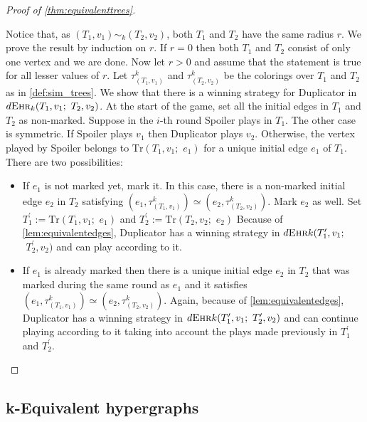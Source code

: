 \documentclass[12pt,notitlepage,a4paper]{article}
\theoremstyle{definition}
\newcommand{\morph}[1]{\sim_#1}
\newcommand{\ehr}{\textsc{Ehr}}
\begin{document}
\begin{proof}[Proof of \cref{thm:equivalenttrees}]~ \par
	Notice that, as $(T_1,v_1)\morph{k} (T_2,v_2)$, both $T_1$ and
	$T_2$ have the same radius $r$.
	We prove the result by induction on $r$.
	If $r=0$ then both $T_1$ and $T_2$ consist
	of only one vertex and we are done.
	Now let $r>0$ and assume that the 
	statement is true for all lesser values of $r$.
	Let $\tau^k_{(T_1,v_1)}$ and $\tau^k_{(T_2,v_2)}$ 
	be the colorings over $T_1$ and $T_2$ as in 
	\cref{def:sim_trees}. 
	We show that there is a winning strategy 
	for Duplicator in
	$d\ehr_k(T_1,v_1;\,\, T_2,v_2)$.
	At the start of the game, set all the initial edges
	in $T_1$ and $T_2$ as non-marked. 
	Suppose in the $i$-th round Spoiler plays in 
	$T_1$. The other case is symmetric. 
	If Spoiler plays $v_1$ then Duplicator plays $v_2$.
	Otherwise, the vertex played by Spoiler belongs to
	$\mathrm{Tr}(T_1,v_1;\,\,e_1)$
	for a unique initial edge $e_1$ of $T_1$. 
	There are two possibilities:
	\begin{itemize}[leftmargin=*]
		\item If $e_1$ is not marked yet, mark it. 
		In this case, there is a 
		non-marked initial
		edge $e_2$ in $T_2$ satisfying 
		$\left(e_1,\tau^k_{(T_1,v_1)}\right)\simeq
		\left(e_2,\tau^k_{(T_2,v_2)}  \right)$.
		Mark $e_2$ as well. 
		Set $T^\prime_1:=\mathrm{Tr}(T_1,v_1;\,\,e_1)$
		and
		$T^\prime_2:=\mathrm{Tr}(T_2,v_2;\,\,e_2)$
		Because of
		\cref{lem:equivalentedges}, Duplicator
		has a winning strategy in
		$ d\ehr{k}(T^\prime_1, v_1;$ $\,\, T^\prime_2,v_2)$
		and can play according to it.
		\item If $e_1$ is already marked then there is
		a unique initial edge $e_2$ in $T_2$ that was 
		marked during the same round as $e_1$ and it satisfies 
		$\left(e_1,\tau^k_{(T_1,v_1)}\right)\simeq
		\left(e_2,\tau^k_{(T_2,v_2)}  \right)$.	
		Again, because of \cref{lem:equivalentedges}, 
		Duplicator has a winning strategy in
		$d\ehr{k}(T^\prime_1, v_1; \,\, T^\prime_2,v_2)$
		and can continue playing according to it taking
		into account the plays made previously in 
		$T^\prime_1$ and $T^\prime_2$.	
	\end{itemize}
\end{proof}

\subsection{k-Equivalent hypergraphs} \label{sect:equivunicycles}
	
\end{document}
